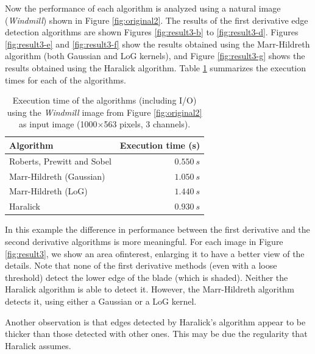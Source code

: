 \documentclass{ipol}
\numberwithin{equation}{section}
\numberwithin{table}{section}
\begin{document}
Now the performance of each algorithm is analyzed using a natural image (\textit{Windmill}) shown in Figure \ref{fig:original2}. 
The results of the first derivative edge detection algorithms are shown Figures \ref{fig:result3-b} to \ref{fig:result3-d}. Figures \ref{fig:result3-e} and \ref{fig:result3-f} show the results obtained using the Marr-Hildreth algorithm (both Gaussian and LoG kernels), and Figure \ref{fig:result3-g} shows the results obtained using the Haralick algorithm. Table \ref{exectime2} summarizes the execution times for each of the algorithms. 


\begin{table}[t!]
	\begin{center}
	\begin{tabular}{| l | r |}
		\hline \rule{0pt}{3ex}
		\cellcolor[gray]{0.8} \textbf{Algorithm}	& \cellcolor[gray]{0.8} \textbf{Execution time (s)}	\\ \hline \rule{0pt}{3ex}
		Roberts, Prewitt and Sobel					& $0.550 \ s$										\\ \hline \rule{0pt}{3ex}
		Marr-Hildreth (Gaussian)					& $1.050 \ s$										\\ \hline \rule{0pt}{3ex}
		Marr-Hildreth (LoG)							& $1.440 \ s$										\\ \hline \rule{0pt}{3ex}
		Haralick									& $0.930 \ s$										\\
		\hline
	\end{tabular}
	\end{center}
	\caption{Execution time of the algorithms (including I/O) using the \emph{Windmill} image from Figure \ref{fig:original2} as input image (1000$\times$563 pixels, 3 channels).}
	\label{exectime2}
\end{table}

In this example the difference in performance between the first derivative and the second derivative algorithms is more meaningful.  For each image in Figure \ref{fig:result3}, we show an area of ​​interest, enlarging it to have a better view of the details. Note that none of the first derivative methods (even with a loose threshold) detect the lower edge of the blade (which is shaded). Neither the Haralick algorithm is able to detect it. However, the Marr-Hildreth algorithm detects it, using either a Gaussian or a LoG kernel. 

Another observation is that edges detected by Haralick's algorithm appear to be thicker than those detected with other ones. This may be due the regularity that Haralick assumes. 
\end{document}
